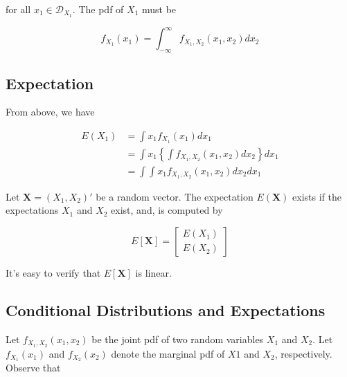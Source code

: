 \documentclass{article}
\begin{document}
                for all $ x_{1} \in \mathcal{D}_{X_{1}} $. The pdf of $ X_{1} $ must be

                \begin{equation*}
                     f_{X_{1}}(x_{1}) = \int_{ -\infty }^{ \infty } f_{X_{1}, X_{2}} (x_{1}, x_{2}) d x_{2}
                \end{equation*}

            \subsection{Expectation}

                From above, we have

                \begin{align*}
                    E(X_{1}) &= \int x_{1} f_{X_{1}}(x_{1}) d x_{1} \\
                             &= \int x_{1} \left\{ \int f_{X_{1}, X_{2}}(x_{1}, x_{2}) d x_{2} \right\} d x_{1} \\
                             &= \int \int x_{1} f_{X_{1}, X_{2}}(x_{1}, x_{2}) d x_{2} d x_{1}
                \end{align*}

                Let $ \mathbf{X} = (X_{1}, X_{2})' $ be a random vector. The
                expectation $ E( \mathbf{X} ) $ exists if the expectations $
                X_{1} $ and $ X_{2} $ exist, and, is computed by

                \begin{equation*}
                    E[ \mathbf{X} ] = \left[ \begin{array}{l}
                            E( X_{1} ) \\
                            E( X_{2} )
                    \end{array} \right]
                \end{equation*}

                It's easy to verify that $ E[ \mathbf{X} ] $ is linear.

            \subsection{Conditional Distributions and Expectations}

                Let $ f_{X_{1}, X_{2}}(x_{1}, x_{2}) $ be the joint pdf of two
                random variables $ X_{1} $ and $ X_{2} $. Let $
                f_{X_{1}}(x_{1}) $ and $ f_{X_{2}}(x_{2}) $ denote the marginal
                pdf of $ X1 $ and $ X_{2} $, respectively. Observe that
\end{document}
